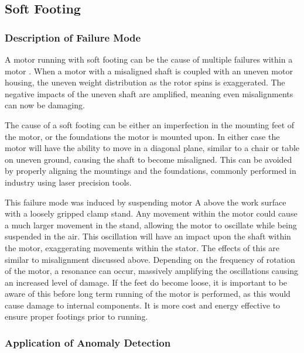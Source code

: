 \subsection{Soft Footing}

\subsubsection{Description of Failure Mode}
A motor running with soft footing can be the cause of multiple failures within a motor \cite{finley1999analytical}. When a motor with a misaligned shaft is coupled with an uneven motor housing, the uneven weight distribution as the rotor spins is exaggerated. The negative impacts of the uneven shaft are amplified, meaning even misalignments can now be damaging. 

The cause of a soft footing can be either an imperfection in the mounting feet of the motor, or the foundations the motor is mounted upon. In either case the motor will have the ability to move in a diagonal plane, similar to a chair or table on uneven ground, causing the shaft to become misaligned. This can be avoided by properly aligning the mountings and the foundations, commonly performed in industry using laser precision tools. 

This failure mode was induced by suspending motor A above the work surface with a loosely gripped clamp stand. Any movement within the motor could cause a much larger movement in the stand, allowing the motor to oscillate while being suspended in the air. This oscillation will have an impact upon the shaft within the motor, exaggerating movements within the stator. The effects of this are similar to misalignment discussed above. Depending on the frequency of rotation of the motor, a resonance can occur, massively amplifying the oscillations causing an increased level of damage. If the feet do become loose, it is important to be aware of this before long term running of the motor is performed, as this would cause damage to internal components. It is more cost and energy effective to ensure proper footings prior to running.

\subsubsection{Application of Anomaly Detection}

